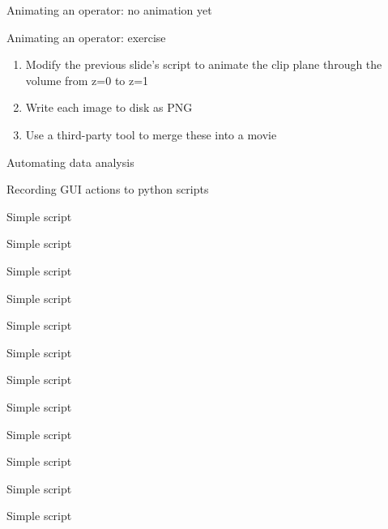 \begin{frame}{Animating an operator: no animation yet}
  
\end{frame}

\begin{frame}{Animating an operator: exercise}
  \begin{enumerate}\setlength{\itemsep}{3mm}
  \item Modify the previous slide's script to animate the clip plane through the volume from z=0 to z=1
  \item Write each image to disk as PNG
  \item Use a third-party tool to merge these into a movie
  \end{enumerate}
\end{frame}





\begin{frame}{Automating data analysis}
\end{frame}

\begin{frame}{Recording GUI actions to python scripts}
\end{frame}

\begin{frame}{Simple script}
\end{frame}
\begin{frame}{Simple script}
\end{frame}
\begin{frame}{Simple script}
\end{frame}
\begin{frame}{Simple script}
\end{frame}
\begin{frame}{Simple script}
\end{frame}
\begin{frame}{Simple script}
\end{frame}
\begin{frame}{Simple script}
\end{frame}
\begin{frame}{Simple script}
\end{frame}
\begin{frame}{Simple script}
\end{frame}
\begin{frame}{Simple script}
\end{frame}
\begin{frame}{Simple script}
\end{frame}
\begin{frame}{Simple script}
\end{frame}
